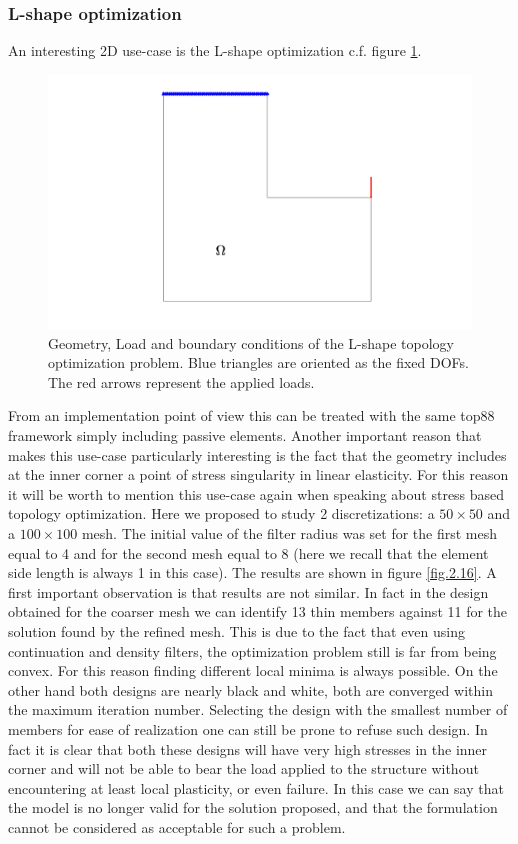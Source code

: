 \subsubsection{L-shape optimization}
An interesting 2D use-case is the L-shape optimization c.f. figure \ref{fig.2.15}. 
\begin{figure}[ht]
\centering
\includegraphics[width=\textwidth]{images/Ch2/design_problem3}
\caption{Geometry, Load and boundary conditions of the L-shape topology optimization problem. Blue triangles are oriented as the fixed DOFs. The red arrows represent the applied loads.}
\label{fig.2.15}
\end{figure}
From an implementation point of view this can be treated with the same top88 framework simply including passive elements. Another important reason that makes this use-case particularly interesting is the fact that the geometry includes at the inner corner a point of stress singularity  in linear elasticity. For this reason it will be worth to mention this use-case again when speaking about stress based topology optimization. Here we proposed to study 2 discretizations: a $50\times50$ and a $100\times100$ mesh.
The initial value of the filter radius was set for the first mesh equal to 4 and for the second mesh equal to 8 (here we recall that the element side length is always 1 in this case). The results are shown in figure \ref{fig.2.16}. A first important observation is that results are not similar. In fact in the design obtained for the coarser mesh we can identify 13 thin members against 11 for the solution found by the refined mesh. This is due to the fact that even using continuation and density filters, the optimization problem still is far from being convex. For this reason finding different local minima is always possible. On the other hand both designs are nearly black and white, both are converged within the maximum iteration number. Selecting the design with the smallest number of members for ease of realization one can still be prone to refuse such design. In fact it is clear that both these designs will have very high stresses in the inner corner and will not be able to bear the load applied to the structure without encountering at least local plasticity, or even failure. In this case we can say that the model is no longer valid for the solution proposed, and that the formulation cannot be considered as acceptable for such a problem. 
